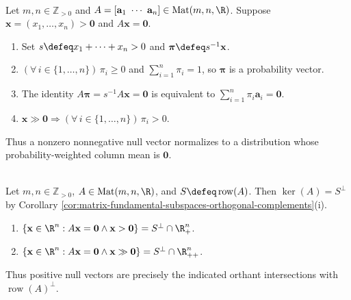 \begin{motivation} \label{mot:positive-solutions-probability-distributions} \\
Let $m,n\in\mathbb{Z}_{>0}$ and $A=[\mathbf{a}_1\ \cdots\ \mathbf{a}_n]\in\operatorname{Mat}(m,n,\R)$. Suppose $\mathbf{x}=(x_1,\ldots,x_n)>\mathbf{0}$ and $A\mathbf{x}=\mathbf{0}$.
\begin{enumerate}[label=(\roman*)]
\setlength{\itemsep}{0pt}
\item Set $s\defeq x_1+\cdots+x_n>0$ and $\boldsymbol{\pi}\defeq s^{-1}\mathbf{x}$.
\item $(\forall\,i\in\{1,\ldots,n\})\,\pi_i\geq0$ and $\sum\limits_{i=1}^{n}\pi_i=1$, so $\boldsymbol{\pi}$ is a probability vector.
\item The identity $A\boldsymbol{\pi}=s^{-1}A\mathbf{x}=\mathbf{0}$ is equivalent to $\sum\limits_{i=1}^{n}\pi_i\mathbf{a}_i=\mathbf{0}$.
\item $\mathbf{x}\gg\mathbf{0}\Longrightarrow(\forall\,i\in\{1,\ldots,n\})\,\pi_i>0$.
\end{enumerate}
Thus a nonzero nonnegative null vector normalizes to a distribution whose probability-weighted column mean is $\mathbf{0}$.
\end{motivation}

\begin{principle} \label{pri:positive-system-row-space-view} \\
Let $m,n\in\mathbb{Z}_{>0}$, $A\in\operatorname{Mat}(m,n,\R)$, and $S\defeq\operatorname{row}(A)$. Then $\ker(A)=S^\perp$ by Corollary \ref{cor:matrix-fundamental-subspaces-orthogonal-complements}(i).
\begin{enumerate}[label=(\roman*)]
\setlength{\itemsep}{0pt}
\item $\{\mathbf{x}\in\R^n:A\mathbf{x}=\mathbf{0}\land\mathbf{x}>\mathbf{0}\}=S^\perp\cap\R_+^n$.
\item $\{\mathbf{x}\in\R^n:A\mathbf{x}=\mathbf{0}\land\mathbf{x}\gg\mathbf{0}\}=S^\perp\cap\R_{++}^n$.
\end{enumerate}
Thus positive null vectors are precisely the indicated orthant intersections with $\operatorname{row}(A)^\perp$.
\end{principle}


